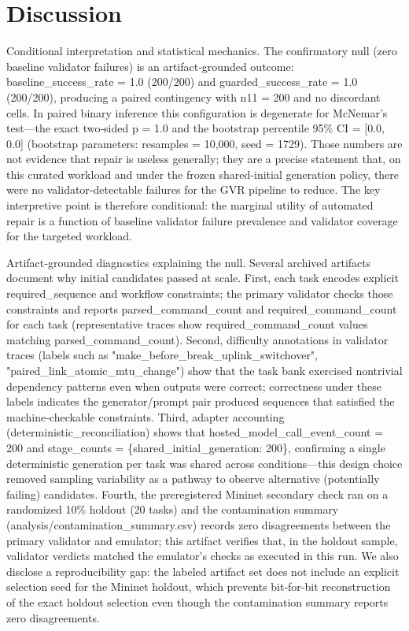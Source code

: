 \documentclass[conference]{IEEEtran}
\begin{document}
\section{Discussion}
Conditional interpretation and statistical mechanics. The confirmatory null (zero baseline validator failures) is an artifact‑grounded outcome: baseline\_success\_rate = 1.0 (200/200) and guarded\_success\_rate = 1.0 (200/200), producing a paired contingency with n11 = 200 and no discordant cells. In paired binary inference this configuration is degenerate for McNemar's test---the exact two‑sided p = 1.0 and the bootstrap percentile 95\% CI = [0.0, 0.0] (bootstrap parameters: resamples = 10,000, seed = 1729). Those numbers are not evidence that repair is useless generally; they are a precise statement that, on this curated workload and under the frozen shared‑initial generation policy, there were no validator‑detectable failures for the GVR pipeline to reduce. The key interpretive point is therefore conditional: the marginal utility of automated repair is a function of baseline validator failure prevalence and validator coverage for the targeted workload.

Artifact‑grounded diagnostics explaining the null. Several archived artifacts document why initial candidates passed at scale. First, each task encodes explicit required\_sequence and workflow constraints; the primary validator checks those constraints and reports parsed\_command\_count and required\_command\_count for each task (representative traces show required\_command\_count values matching parsed\_command\_count). Second, difficulty annotations in validator traces (labels such as "make\_before\_break\_uplink\_switchover", "paired\_link\_atomic\_mtu\_change") show that the task bank exercised nontrivial dependency patterns even when outputs were correct; correctness under these labels indicates the generator/prompt pair produced sequences that satisfied the machine‑checkable constraints. Third, adapter accounting (deterministic\_reconciliation) shows that hosted\_model\_call\_event\_count = 200 and stage\_counts = \{shared\_initial\_generation: 200\}, confirming a single deterministic generation per task was shared across conditions---this design choice removed sampling variability as a pathway to observe alternative (potentially failing) candidates. Fourth, the preregistered Mininet secondary check ran on a randomized 10\% holdout (20 tasks) and the contamination summary (analysis/contamination\_summary.csv) records zero disagreements between the primary validator and emulator; this artifact verifies that, in the holdout sample, validator verdicts matched the emulator's checks as executed in this run. We also disclose a reproducibility gap: the labeled artifact set does not include an explicit selection seed for the Mininet holdout, which prevents bit‑for‑bit reconstruction of the exact holdout selection even though the contamination summary reports zero disagreements.
\end{document}
